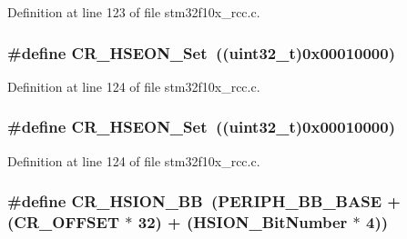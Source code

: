 Definition at line 123 of file stm32f10x\+\_\+rcc.\+c.

\subsubsection[{\texorpdfstring{C\+R\+\_\+\+H\+S\+E\+O\+N\+\_\+\+Set}{CR_HSEON_Set}}]{\setlength{\rightskip}{0pt plus 5cm}\#define C\+R\+\_\+\+H\+S\+E\+O\+N\+\_\+\+Set~(({\bf uint32\+\_\+t})0x00010000)}\hypertarget{group___r_c_c___private___defines_gaca6ef9e2f11b921355809a5eccfec864}{}\label{group___r_c_c___private___defines_gaca6ef9e2f11b921355809a5eccfec864}


Definition at line 124 of file stm32f10x\+\_\+rcc.\+c.

\subsubsection[{\texorpdfstring{C\+R\+\_\+\+H\+S\+E\+O\+N\+\_\+\+Set}{CR_HSEON_Set}}]{\setlength{\rightskip}{0pt plus 5cm}\#define C\+R\+\_\+\+H\+S\+E\+O\+N\+\_\+\+Set~(({\bf uint32\+\_\+t})0x00010000)}\hypertarget{group___r_c_c___private___defines_gaca6ef9e2f11b921355809a5eccfec864}{}\label{group___r_c_c___private___defines_gaca6ef9e2f11b921355809a5eccfec864}


Definition at line 124 of file stm32f10x\+\_\+rcc.\+c.

\subsubsection[{\texorpdfstring{C\+R\+\_\+\+H\+S\+I\+O\+N\+\_\+\+BB}{CR_HSION_BB}}]{\setlength{\rightskip}{0pt plus 5cm}\#define C\+R\+\_\+\+H\+S\+I\+O\+N\+\_\+\+BB~({\bf P\+E\+R\+I\+P\+H\+\_\+\+B\+B\+\_\+\+B\+A\+SE} + ({\bf C\+R\+\_\+\+O\+F\+F\+S\+ET} $\ast$ 32) + ({\bf H\+S\+I\+O\+N\+\_\+\+Bit\+Number} $\ast$ 4))}\hypertarget{group___r_c_c___private___defines_gac3290a833c0e35ec17d32c2d494e6133}{}\label{group___r_c_c___private___defines_gac3290a833c0e35ec17d32c2d494e6133}


